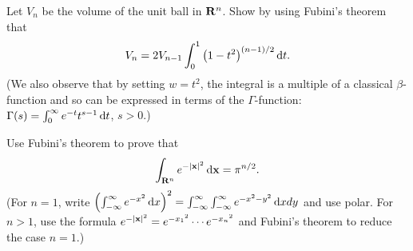 \begin{problem}
  Let $V_n$ be the volume of the unit ball in $\mathbf{R}^n$. Show by using
  Fubini's theorem that
  \[
    V_n=2V_{n-1}\int_0^1\left(1-t^2\right)^{(n-1)/2}\mathop{}\!\mathrm{d} t.
  \]
  (We also observe that by setting $w=t^2$, the integral is a multiple of a
  classical $\beta$-function and so can be expressed in terms of the
  $\Gamma$-function: $\Gamma(s)=\int_0^\infty e^{-t}t^{s-1}\mathop{}\!\mathrm{d} t$,
  $s>0$.)
\end{problem}
\begin{solution}
\end{solution}

\begin{problem}
  Use Fubini's theorem to prove that
  \[
    \int_{\mathbf{R}^n}e^{-|\mathbf{x}|^2}\mathop{}\!\mathrm{d}\mathbf{x}=\pi^{n/2}.
  \]
  (For $n=1$, write
  $\left(\int_{-\infty}^\infty e^{-x^2}\mathop{}\!\mathrm{d}
    x\right)^2=\int_{-\infty}^\infty\int_{-\infty}^\infty e^{-x^2-y^2}\mathop{}\!\mathrm{d}
  xdy$ and use polar. For $n>1$, use the formula
  $e^{-|\mathbf{x}|^2}=e^{-{x_1}^2}\cdots e^{-{x_n}^2}$ and Fubini's theorem to
  reduce the case $n=1$.)
\end{problem}
\begin{solution}
\end{solution}


